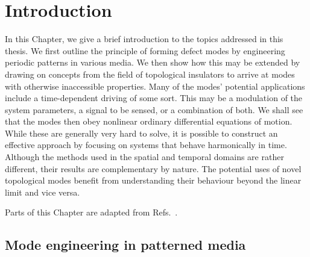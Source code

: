 
\chapter{Introduction} \label{ch:intro} 

\begin{chapterabstract}
	
	In this Chapter, we give a brief introduction to the topics addressed in this thesis. We first outline the principle of forming defect modes by engineering periodic patterns in various media. We then show how this may be extended by drawing on concepts from the field of topological insulators to arrive at modes with otherwise inaccessible properties. 
	Many of the modes' potential applications include a time-dependent driving of some sort. This may be a modulation of the system parameters, a signal to be sensed, or a combination of both. We shall see that the modes then obey nonlinear ordinary differential equations of motion. While these are generally very hard to solve, it is possible to construct an effective approach by focusing on systems that behave harmonically in time.
	Although the methods used in the spatial and temporal domains are rather different, their results are complementary by nature. The potential uses of novel topological modes benefit from understanding their behaviour beyond the linear limit and vice versa.

	\tcblower
	Parts of this Chapter are adapted from Refs.~\cite{Kosata_2022a, Kosata_2021}.
\end{chapterabstract}

\section{Mode engineering in patterned media} \label{sec:intro_spatial}

